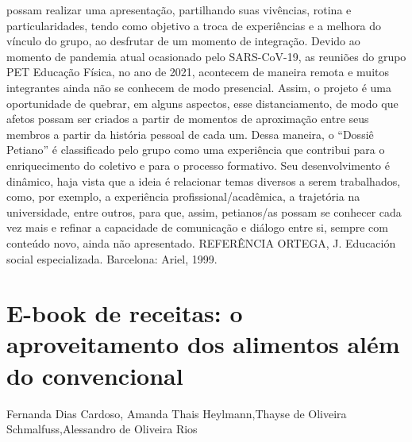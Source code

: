 possam realizar uma apresentação, partilhando suas vivências, rotina e particularidades, tendo 
como objetivo a troca de experiências e a melhora do vínculo do grupo, ao desfrutar de um 
momento de integração. Devido ao momento de pandemia atual ocasionado pelo SARS-CoV-19, 
as reuniões do grupo PET Educação Física, no ano de 2021, acontecem de maneira remota e muitos 
integrantes ainda não se conhecem de modo presencial. Assim, o projeto é uma oportunidade de 
quebrar, em alguns aspectos, esse distanciamento, de modo que afetos possam ser criados a partir 
de momentos de aproximação entre seus membros a partir da história pessoal de cada um.
Dessa maneira, o “Dossiê Petiano” é classificado pelo grupo como uma experiência que 
contribui para o enriquecimento do coletivo e para o processo formativo. Seu desenvolvimento é 
dinâmico, haja vista que a ideia é relacionar temas diversos a serem trabalhados, como, por 
exemplo, a experiência profissional/acadêmica, a trajetória na universidade, entre outros, para que, 
assim, petianos/as possam se conhecer cada vez mais e refinar a capacidade de comunicação e 
diálogo entre si, sempre com conteúdo novo, ainda não apresentado.
REFERÊNCIA
ORTEGA, J. Educación social especializada. Barcelona: Ariel, 1999.



\section{E-book de receitas: o aproveitamento dos alimentos além do convencional}

Fernanda Dias Cardoso, Amanda Thais Heylmann,Thayse de Oliveira Schmalfuss,Alessandro de Oliveira Rios

